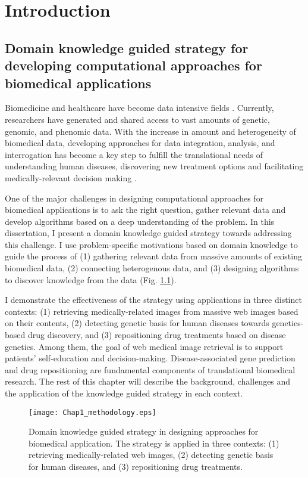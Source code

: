\chapter{Introduction}\label{chap:introduction}

\section{Domain knowledge guided strategy for developing computational approaches for biomedical applications}
Biomedicine and healthcare have become data intensive fields \cite{costa2014big}.
Currently,  researchers have generated and shared access to vast amounts of
genetic, genomic, and phenomic data.
With the increase in amount and heterogeneity of biomedical data,
developing approaches for data integration, analysis, and interrogation
has become a key step to fulfill the translational needs of
understanding human diseases, discovering new treatment options and
facilitating medically-relevant decision making \cite{shah2012coming,bellazzi2011data}.



One of the major challenges in designing computational approaches for biomedical applications
is to ask the right question, gather relevant data and develop algorithms based on a deep understanding of the problem.
In this dissertation, I present a domain knowledge guided strategy towards addressing this challenge.
I use problem-specific motivations based on domain knowledge
to guide the process of (1) gathering relevant data from massive amounts of existing biomedical data,
(2) connecting heterogenous data, and (3) designing algorithms to discover knowledge from the data (Fig. \ref{methodology}).

I demonstrate the effectiveness of the strategy using applications in three distinct contexts:
(1) retrieving medically-related images from massive web images based on their contents,
(2) detecting genetic basis for human diseases towards
genetics-based drug discovery,
and (3) repositioning drug treatments based on disease genetics.
Among them, the goal of web medical image retrieval is to support patients'
self-education and decision-making.
Disease-associated gene prediction and drug repositioning are fundamental components
of translational biomedical research.
The rest of this chapter will describe the background, challenges and the application of the
knowledge guided strategy in each context.


\begin{figure}[htb!]
\vspace{0em}
\begin{center}
\texttt{[image: Chap1\_methodology.eps]}
\vspace {0em}\caption{Domain knowledge guided strategy in designing approaches for biomedical application. The strategy is applied in three contexts: (1) retrieving medically-related web images, (2) detecting genetic basis for human diseases, and (3) repositioning drug treatments.} \label{methodology}
\end{center}
\vspace {0em}
\end{figure}


